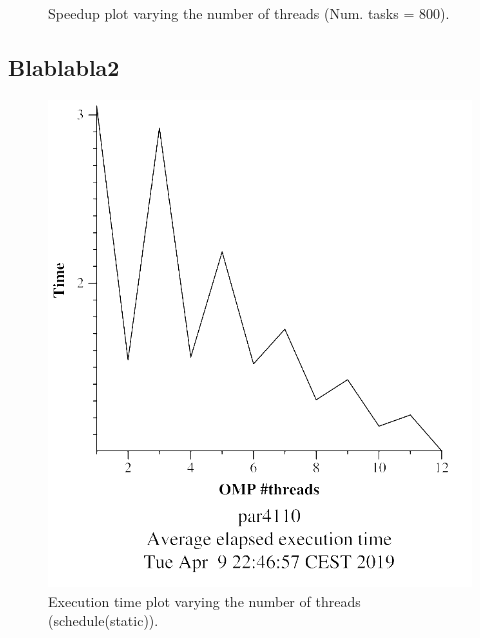 \documentclass[12pt, a4paper]{article}
\begin{document}
\begin{figure}[H]
\begin{minipage}[b]{0.4\linewidth}
  \caption{Speedup plot varying the number of threads (Num. tasks = 800).}
  \label{fig:mandel-omp-10000-strong-omp-24-800-speedup}
\end{minipage}
\end{figure}

\subsection{Blablabla2}

\begin{figure}[H]
\centering
\begin{minipage}[b]{0.4\linewidth}
  \centering
  \includegraphics[scale=0.5]{./mandel-omp-10000-strong-omp-for-static-time}
  \caption{Execution time plot varying the number of threads (schedule(static)).}
  \label{fig:mandel-omp-10000-strong-omp-for-static-time}
\end{minipage}%
\hspace{0.5cm}
\begin{minipage}[b]{0.4\linewidth}
  \centering

\end{minipage}
\end{figure}
\end{document}
